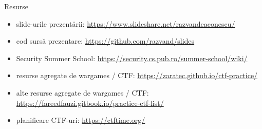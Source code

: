 \documentclass{simple}
\begin{document}
\begin{frame}{Resurse}
  \begin{itemize}
    \item slide-urile prezentării: \url{https://www.slideshare.net/razvandeaconescu/}
    \item cod sursă prezentare: \url{https://github.com/razvand/slides}
    \item Security Summer School: \url{https://security.cs.pub.ro/summer-school/wiki/}
    \item resurse agregate de wargames / CTF: \url{https://zaratec.github.io/ctf-practice/}
    \item alte resurse agregate de wargames / CTF: \url{https://fareedfauzi.gitbook.io/practice-ctf-list/}
    \item planificare CTF-uri: \url{https://ctftime.org/}
  \end{itemize}
\end{frame}
\end{document}
